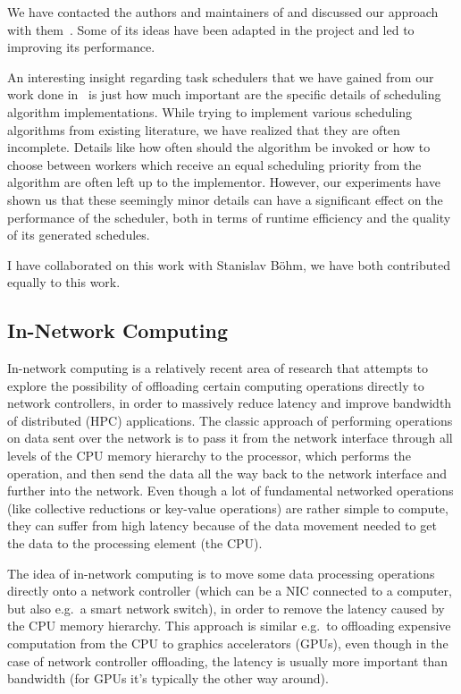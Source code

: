 We have contacted the authors and maintainers of \dask{} and discussed our \rsds{} approach with
them~.
Some of its ideas have been adapted in the \dask{} project and led to improving its performance.

An interesting insight regarding task schedulers that we have gained from our work done
in~\cite{estee,rsds} is just how much important are the specific details of scheduling algorithm
implementations. While trying to implement various scheduling algorithms from existing
literature, we have realized that they are often incomplete. Details like how
often should the algorithm be invoked or how to choose between workers which receive an equal
scheduling priority from the algorithm are often left up to the implementor. However, our
experiments have shown us that these seemingly minor details can have a significant effect on
the performance of the scheduler, both in terms of runtime efficiency and the quality of its
generated schedules.

I have collaborated on this work with Stanislav Böhm, we have both contributed equally to this
work.

\subsection{In-Network Computing}
In-network computing is a relatively recent area of research that attempts to explore the
possibility of offloading certain computing operations directly to network controllers, in order
to massively reduce latency and improve bandwidth of distributed (HPC) applications. The classic
approach of performing operations on data sent over the network is to pass it from the network
interface through all levels of the CPU memory hierarchy to the processor, which performs the
operation, and then send the data all the way back to the network interface and further into the
network. Even though a lot of fundamental networked operations (like collective reductions or
key-value operations) are rather simple to compute, they can suffer from high latency because of
the data movement needed to get the data to the processing element (the CPU).

The idea of in-network computing is to move some data processing operations directly onto a
network controller (which can be a NIC connected to a computer, but also e.g.\ a smart network
switch), in order to remove the latency caused by the CPU memory hierarchy. This
approach is similar e.g.\ to offloading expensive computation from the CPU to graphics
accelerators (GPUs), even though in the case of network controller offloading, the latency is
usually more important than bandwidth (for GPUs it's typically the other way around).

